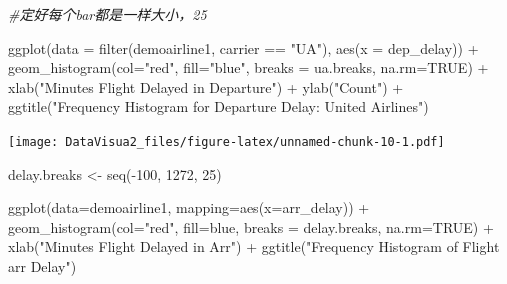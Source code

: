 \documentclass[
]{article}
\newenvironment{Shaded}{\begin{snugshade}}{\end{snugshade}}
\newcommand{\AttributeTok}[1]{\textcolor[rgb]{0.77,0.63,0.00}{#1}}
\newcommand{\CommentTok}[1]{\textcolor[rgb]{0.56,0.35,0.01}{\textit{#1}}}
\newcommand{\ConstantTok}[1]{\textcolor[rgb]{0.00,0.00,0.00}{#1}}
\newcommand{\DecValTok}[1]{\textcolor[rgb]{0.00,0.00,0.81}{#1}}
\newcommand{\FunctionTok}[1]{\textcolor[rgb]{0.00,0.00,0.00}{#1}}
\newcommand{\NormalTok}[1]{#1}
\newcommand{\OtherTok}[1]{\textcolor[rgb]{0.56,0.35,0.01}{#1}}
\newcommand{\SpecialCharTok}[1]{\textcolor[rgb]{0.00,0.00,0.00}{#1}}
\newcommand{\StringTok}[1]{\textcolor[rgb]{0.31,0.60,0.02}{#1}}
\begin{document}
\begin{Shaded}
\begin{Highlighting}[]
\CommentTok{\#定好每个bar都是一样大小，25}
\end{Highlighting}
\end{Shaded}

\begin{Shaded}
\begin{Highlighting}[]
\FunctionTok{ggplot}\NormalTok{(}\AttributeTok{data =} \FunctionTok{filter}\NormalTok{(demoairline1, carrier }\SpecialCharTok{==} \StringTok{"UA"}\NormalTok{), }\FunctionTok{aes}\NormalTok{(}\AttributeTok{x =}\NormalTok{ dep\_delay)) }\SpecialCharTok{+} \FunctionTok{geom\_histogram}\NormalTok{(}\AttributeTok{col=}\StringTok{"red"}\NormalTok{, }\AttributeTok{fill=}\StringTok{"blue"}\NormalTok{, }\AttributeTok{breaks =}\NormalTok{ ua.breaks, }\AttributeTok{na.rm=}\ConstantTok{TRUE}\NormalTok{) }\SpecialCharTok{+} \FunctionTok{xlab}\NormalTok{(}\StringTok{"Minutes Flight Delayed in Departure"}\NormalTok{) }\SpecialCharTok{+} \FunctionTok{ylab}\NormalTok{(}\StringTok{"Count"}\NormalTok{) }\SpecialCharTok{+} \FunctionTok{ggtitle}\NormalTok{(}\StringTok{"Frequency Histogram for Departure Delay: United Airlines"}\NormalTok{)}
\end{Highlighting}
\end{Shaded}

\texttt{[image: DataVisua2\_files/figure-latex/unnamed-chunk-10-1.pdf]}

\begin{Shaded}
\begin{Highlighting}[]
\NormalTok{delay.breaks }\OtherTok{\textless{}{-}} \FunctionTok{seq}\NormalTok{(}\SpecialCharTok{{-}}\DecValTok{100}\NormalTok{, }\DecValTok{1272}\NormalTok{, }\DecValTok{25}\NormalTok{)}


\FunctionTok{ggplot}\NormalTok{(}\AttributeTok{data=}\NormalTok{demoairline1, }\AttributeTok{mapping=}\FunctionTok{aes}\NormalTok{(}\AttributeTok{x=}\NormalTok{arr\_delay)) }\SpecialCharTok{+} \FunctionTok{geom\_histogram}\NormalTok{(}\AttributeTok{col=}\StringTok{"red"}\NormalTok{, }\AttributeTok{fill=}\StringTok{\textquotesingle{}blue\textquotesingle{}}\NormalTok{, }\AttributeTok{breaks =}\NormalTok{ delay.breaks, }\AttributeTok{na.rm=}\ConstantTok{TRUE}\NormalTok{) }\SpecialCharTok{+} \FunctionTok{xlab}\NormalTok{(}\StringTok{"Minutes Flight Delayed in Arr"}\NormalTok{) }\SpecialCharTok{+} \FunctionTok{ggtitle}\NormalTok{(}\StringTok{"Frequency Histogram of Flight arr Delay"}\NormalTok{)}
\end{Highlighting}
\end{Shaded}
\end{document}
